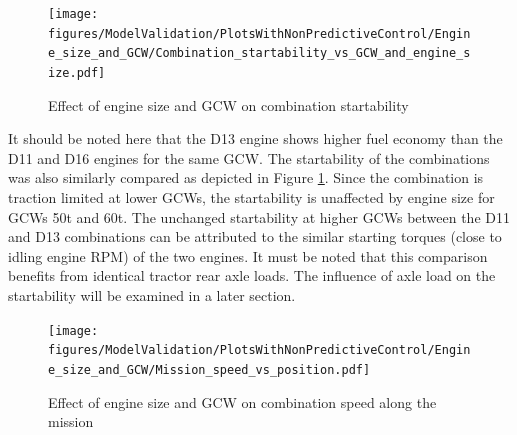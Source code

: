 \documentclass[ExampleMasters.tex]{subfiles}
\begin{document}
\begin{figure}[h!]
\centering
\texttt{[image: figures/ModelValidation/PlotsWithNonPredictiveControl/Engine\_size\_and\_GCW/Combination\_startability\_vs\_GCW\_and\_engine\_size.pdf]}
\caption{Effect of engine size and GCW on combination startability}
\label{startabilityEngineGCW}
\end{figure}

It should be noted here that the D13 engine shows higher fuel economy than the D11 and D16 engines for the same GCW. The startability of the combinations was also similarly compared as depicted in Figure \ref{startabilityEngineGCW}. Since the combination is traction limited at lower GCWs, the startability is unaffected by engine size for GCWs 50t and 60t. The unchanged startability at higher GCWs between the D11 and D13 combinations can be attributed to the similar starting torques (close to idling engine RPM) of the two engines. It must be noted that this comparison benefits from identical tractor rear axle loads. The influence of axle load on the startability will be examined in a later section.\\

\begin{figure}[h!]
\centering
\texttt{[image: figures/ModelValidation/PlotsWithNonPredictiveControl/Engine\_size\_and\_GCW/Mission\_speed\_vs\_position.pdf]}
\caption{Effect of engine size and GCW on combination speed along the mission}
\label{missionSpeedEngineSizeGCW}
\end{figure}
\end{document}
